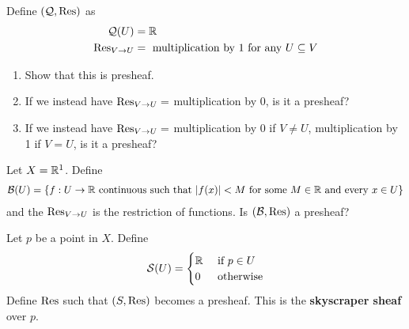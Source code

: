 \begin{ques}
	Define $(\mathcal{Q}, \operatorname{Res})$ as
	\begin{align*}
		\mathcal{Q}(U) &= \mathbb{R}\\
		\operatorname{Res}_{V \rightarrow U} &= \mbox{ multiplication by }1 \mbox{ for any } U \subseteq V
	\end{align*}
	\begin{enumerate}
		\item Show that this is  presheaf.
		\item If we instead have $\operatorname{Res}_{V \rightarrow U} = $ multiplication by 0, is it a presheaf?
		\item If we instead have $\operatorname{Res}_{V \rightarrow U} = $ multiplication by 0 if $V \neq U$, multiplication by 1 if $V = U$, is it a presheaf?
	\end{enumerate}
\end{ques}

\begin{ques}
	Let $X = \mathbb{R}^1$. Define
	\begin{align*}
		\mathcal{B}(U) = \{ f : U \rightarrow \mathbb{R} \mbox{ continuous such that } |f(x)| < M \mbox{ for some $M \in \mathbb{R}$ and every } x \in U \}
	\end{align*}
	and the $\operatorname{Res}_{V \rightarrow U} $ is the restriction of functions. Is $(\mathcal{B},\operatorname{Res})$ a presheaf?
\end{ques}

\begin{ques}
	Let $p$ be a point in $X$. Define
	\begin{align*}
		\mathcal{S}(U) = \begin{cases}
			 \mathbb{R}	& \mbox{ if } p \in U \\
			 0 & \mbox{ otherwise}
		\end{cases}
	\end{align*}
	Define $\operatorname{Res}$ such that $(S,\operatorname{Res})$ becomes a presheaf. This is the \textbf{skyscraper sheaf} over $p$.
\end{ques}

